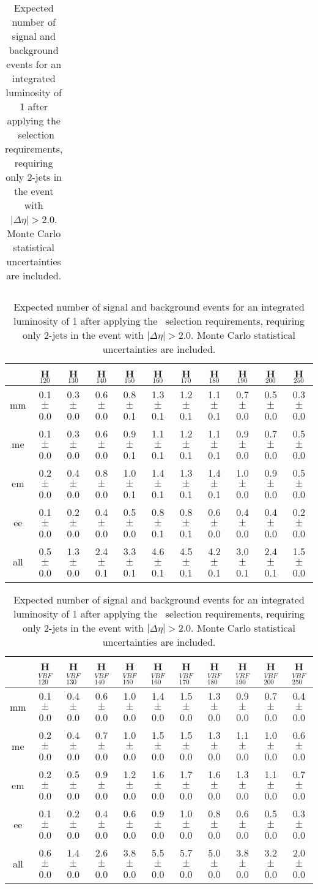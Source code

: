 \begin{table}[!ht]
\begin{center}
{\begin{tabular} {|c|c|c|c|c|c|c|c|c|c|c|}
 \hline
  \end{tabular}
  }
 {\small
  \begin{tabular} {|c|c|c|c|c|c|c|c|c|c|c|}
  \hline
     &   H$_{120}$ &  H$_{130}$ &    H$_{140}$ &   H$_{150}$ &   H$_{160}$ &   H$_{170}$ &   H$_{180}$ &   H$_{190}$ &   H$_{200}$ &   H$_{250}$ \\
  \hline
  \hline
  mm &  0.1$\pm$0.0 &  0.3$\pm$0.0 &  0.6$\pm$0.0 &  0.8$\pm$0.1 &  1.3$\pm$0.1 &  1.2$\pm$0.1 &  1.1$\pm$0.1 &  0.7$\pm$0.0 &  0.5$\pm$0.0 &  0.3$\pm$0.0 \\
  me &  0.1$\pm$0.0 &  0.3$\pm$0.0 &  0.6$\pm$0.0 &  0.9$\pm$0.1 &  1.1$\pm$0.1 &  1.2$\pm$0.1 &  1.1$\pm$0.1 &  0.9$\pm$0.0 &  0.7$\pm$0.0 &  0.5$\pm$0.0 \\
  em &  0.2$\pm$0.0 &  0.4$\pm$0.0 &  0.8$\pm$0.0 &  1.0$\pm$0.1 &  1.4$\pm$0.1 &  1.3$\pm$0.1 &  1.4$\pm$0.1 &  1.0$\pm$0.0 &  0.9$\pm$0.0 &  0.5$\pm$0.0 \\
  ee &  0.1$\pm$0.0 &  0.2$\pm$0.0 &  0.4$\pm$0.0 &  0.5$\pm$0.0 &  0.8$\pm$0.1 &  0.8$\pm$0.1 &  0.6$\pm$0.0 &  0.4$\pm$0.0 &  0.4$\pm$0.0 &  0.2$\pm$0.0 \\
  \hline
 all &  0.5$\pm$0.0 &  1.3$\pm$0.0 &  2.4$\pm$0.1 &  3.3$\pm$0.1 &  4.6$\pm$0.1 &  4.5$\pm$0.1 &  4.2$\pm$0.1 &  3.0$\pm$0.1 &  2.4$\pm$0.1 &  1.5$\pm$0.0 \\
 \hline
  \end{tabular}
  }
 {\small
  \begin{tabular} {|c|c|c|c|c|c|c|c|c|c|c|}
  \hline
     &   H$^{VBF}_{120}$ &  H$^{VBF}_{130}$ &    H$^{VBF}_{140}$ &   H$^{VBF}_{150}$ &   H$^{VBF}_{160}$ &   H$^{VBF}_{170}$ &   H$^{VBF}_{180}$ &   H$^{VBF}_{190}$ &   H$^{VBF}_{200}$ &   H$^{VBF}_{250}$ \\
  \hline
  \hline
  mm &  0.1$\pm$0.0 &  0.4$\pm$0.0 &  0.6$\pm$0.0 &  1.0$\pm$0.0 &  1.4$\pm$0.0 &  1.5$\pm$0.0 &  1.3$\pm$0.0 &  0.9$\pm$0.0 &  0.7$\pm$0.0 &  0.4$\pm$0.0 \\
  me &  0.2$\pm$0.0 &  0.4$\pm$0.0 &  0.7$\pm$0.0 &  1.0$\pm$0.0 &  1.5$\pm$0.0 &  1.5$\pm$0.0 &  1.3$\pm$0.0 &  1.1$\pm$0.0 &  1.0$\pm$0.0 &  0.6$\pm$0.0 \\
  em &  0.2$\pm$0.0 &  0.5$\pm$0.0 &  0.9$\pm$0.0 &  1.2$\pm$0.0 &  1.6$\pm$0.0 &  1.7$\pm$0.0 &  1.6$\pm$0.0 &  1.3$\pm$0.0 &  1.1$\pm$0.0 &  0.7$\pm$0.0 \\
  ee &  0.1$\pm$0.0 &  0.2$\pm$0.0 &  0.4$\pm$0.0 &  0.6$\pm$0.0 &  0.9$\pm$0.0 &  1.0$\pm$0.0 &  0.8$\pm$0.0 &  0.6$\pm$0.0 &  0.5$\pm$0.0 &  0.3$\pm$0.0 \\
  \hline
 all &  0.6$\pm$0.0 &  1.4$\pm$0.0 &  2.6$\pm$0.0 &  3.8$\pm$0.0 &  5.5$\pm$0.0 &  5.7$\pm$0.0 &  5.0$\pm$0.0 &  3.8$\pm$0.0 &  3.2$\pm$0.0 &  2.0$\pm$0.0 \\

 \hline
  \end{tabular}
  }
  \caption{Expected number of signal and background events for an 
  integrated luminosity of 1\ifb{} after 
  applying the \ww\ selection requirements, requiring only 2-jets in the event with $|\Delta\eta|>2.0$.
  Monte Carlo statistical uncertainties are  included.}
   \label{tab:wwselection2}
  \end{center}
\end{table}
